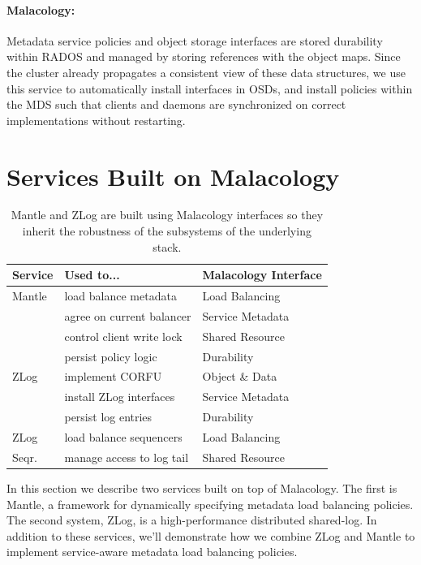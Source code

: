 \documentclass[preprint]{sigplanconf-eurosys}
\begin{document}
\paragraph*{Malacology:} Metadata service policies and object storage
interfaces are stored durability within RADOS and managed by storing references
with the object maps. Since the cluster already propagates a consistent view of
these data structures, we use this service to automatically install interfaces
in OSDs, and install policies within the MDS such that clients and daemons are
synchronized on correct implementations without restarting.

\section{Services Built on Malacology}
\label{sec:services}
\label{services-built-on-malacology}

\label{services}
\begin{table}
\centering
\begin{tabular}{  l | l | l }
\textbf{Service}              &
\textbf{Used to...}           &
\textbf{Malacology Interface} \\ \hline
Mantle & load balance metadata     & Load Balancing  \\
       & agree on current balancer & Service Metadata\\
       & control client write lock & Shared Resource \\
       & persist policy logic      & Durability      \\ \hline
ZLog   & implement CORFU           & Object \& Data  \\ 
       & install ZLog interfaces   & Service Metadata\\
       & persist log entries       & Durability      \\ \hline
ZLog   & load balance sequencers   & Load Balancing  \\
Seqr.  & manage access to log tail & Shared Resource \\ 
\end{tabular}
\caption{Mantle and ZLog are built using Malacology interfaces so they inherit the
robustness of the subsystems of the underlying stack.}
\label{table:implementation}
\end{table}

In this section we describe two services built on top of Malacology. The first
is Mantle, a framework for dynamically specifying metadata load balancing
policies. The second system, ZLog, is a high-performance distributed shared-log.
In addition to these services, we'll demonstrate how we combine ZLog and Mantle
to implement service-aware metadata load balancing policies.
\end{document}
